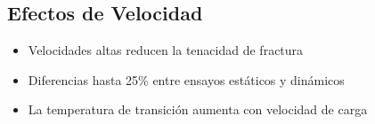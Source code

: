 \documentclass[12pt,letterpaper]{article}
\begin{document}
\subsection{Efectos de Velocidad}
\begin{itemize}
\item Velocidades altas reducen la tenacidad de fractura
\item Diferencias hasta 25\% entre ensayos estáticos y dinámicos
\item La temperatura de transición aumenta con velocidad de carga
\end{itemize}

\newpage
\printbibliography[title=Referencias]
\end{document}
